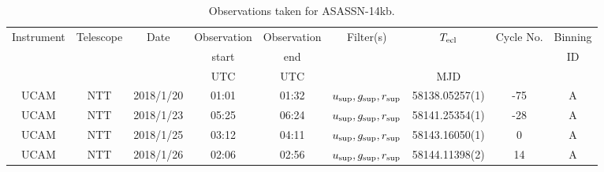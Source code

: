 \begin{table}
	\begin{center}
		\caption{Observations taken for ASASSN-14kb.}
		\label{table:observing:observation logs ASASSN-14kb}
		\begin{tabular}{ccccccccc}
			\hline
			Instrument & Telescope & Date & Observation  & Observation  & Filter(s) & $T_{\rm ecl}$ & Cycle No. & Binning \\
			 &  &  &  start &  end &  &  &  & ID \\
			 &  &  & UTC & UTC &  & MJD &  &  \\
			\hline
			\hline
			UCAM & NTT & 2018/1/20 & 01:01 & 01:32 & $u_{\rm sup},g_{\rm sup},r_{\rm sup}$ & 58138.05257(1) & -75 & A \\
			UCAM & NTT & 2018/1/23 & 05:25 & 06:24 & $u_{\rm sup},g_{\rm sup},r_{\rm sup}$ & 58141.25354(1) & -28 & A \\
			UCAM & NTT & 2018/1/25 & 03:12 & 04:11 & $u_{\rm sup},g_{\rm sup},r_{\rm sup}$ & 58143.16050(1) &   0 & A \\
			UCAM & NTT & 2018/1/26 & 02:06 & 02:56 & $u_{\rm sup},g_{\rm sup},r_{\rm sup}$ & 58144.11398(2) &  14 & A \\
		   \hline
		\end{tabular}
	\end{center}
\end{table}